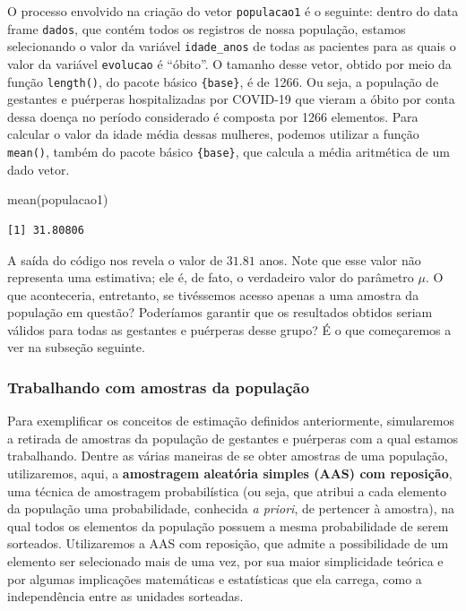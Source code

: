 \documentclass[
  letterpaper,
  DIV=11,
  numbers=noendperiod]{scrreprt}
\newenvironment{Shaded}{\begin{snugshade}}{\end{snugshade}}
\newcommand{\FunctionTok}[1]{\textcolor[rgb]{0.28,0.35,0.67}{#1}}
\newcommand{\NormalTok}[1]{\textcolor[rgb]{0.00,0.23,0.31}{#1}}
\begin{document}
O processo envolvido na criação do vetor \texttt{populacao1} é o
seguinte: dentro do data frame \texttt{dados}, que contém todos os
registros de nossa população, estamos selecionando o valor da variável
\texttt{idade\_anos} de todas as pacientes para as quais o valor da
variável \texttt{evolucao} é ``óbito''. O tamanho desse vetor, obtido
por meio da função \texttt{length()}, do pacote básico
\texttt{\{base\}}, é de 1266. Ou seja, a população de gestantes e
puérperas hospitalizadas por COVID-19 que vieram a óbito por conta dessa
doença no período considerado é composta por 1266 elementos. Para
calcular o valor da idade média dessas mulheres, podemos utilizar a
função \texttt{mean()}, também do pacote básico \texttt{\{base\}}, que
calcula a média aritmética de um dado vetor.

\begin{Shaded}
\begin{Highlighting}[]
\FunctionTok{mean}\NormalTok{(populacao1)}
\end{Highlighting}
\end{Shaded}

\begin{verbatim}
[1] 31.80806
\end{verbatim}

A saída do código nos revela o valor de \(31.81\) anos. Note que esse
valor não representa uma estimativa; ele é, de fato, o verdadeiro valor
do parâmetro \(\mu\). O que aconteceria, entretanto, se tivéssemos
acesso apenas a uma amostra da população em questão? Poderíamos garantir
que os resultados obtidos seriam válidos para todas as gestantes e
puérperas desse grupo? É o que começaremos a ver na subseção seguinte.

\hypertarget{trabalhando-com-amostras-da-populauxe7uxe3o}{%
\subsubsection{Trabalhando com amostras da
população}\label{trabalhando-com-amostras-da-populauxe7uxe3o}}

Para exemplificar os conceitos de estimação definidos anteriormente,
simularemos a retirada de amostras da população de gestantes e puérperas
com a qual estamos trabalhando. Dentre as várias maneiras de se obter
amostras de uma população, utilizaremos, aqui, a \textbf{amostragem
aleatória simples (AAS) com reposição}, uma técnica de amostragem
probabilística (ou seja, que atribui a cada elemento da população uma
probabilidade, conhecida \emph{a priori}, de pertencer à amostra), na
qual todos os elementos da população possuem a mesma probabilidade de
serem sorteados. Utilizaremos a AAS com reposição, que admite a
possibilidade de um elemento ser selecionado mais de uma vez, por sua
maior simplicidade teórica e por algumas implicações matemáticas e
estatísticas que ela carrega, como a independência entre as unidades
sorteadas.
\end{document}
